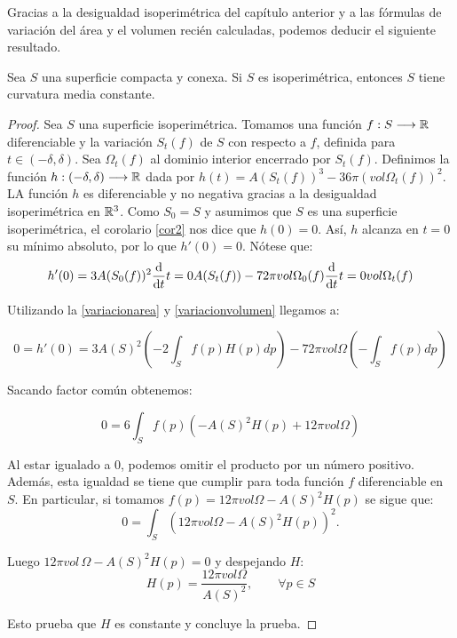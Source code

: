 Gracias a la desigualdad isoperimétrica del capítulo anterior y a las fórmulas de variación del área y el volumen recién calculadas, podemos deducir el siguiente resultado.

\begin{theorem}\label{meancurvaturecte}
Sea $S$ una superficie compacta y conexa. Si $S$ es isoperimétrica, entonces $S$ tiene curvatura media constante.
\end{theorem}
\begin{proof}
Sea $S$ una superficie isoperimétrica. Tomamos una función $f: S \longrightarrow \mathbb{R}$ diferenciable y la variación $S_t(f)$ de $S$ con respecto a $f$, definida para $t \in (-\delta, \delta)$. Sea $\Omega_t(f)$ al dominio interior encerrado por $S_t(f)$. Definimos la función $h: (-\delta, \delta) \longrightarrow \mathbb{R}$ dada por $h(t) = A(S_t(f))^3 - 36\pi(vol \Omega_t(f))^2$. LA función $h$ es diferenciable y no negativa gracias a la desigualdad isoperimétrica en $\mathbb{R}^3$. Como $S_0=S$ y asumimos que $S$ es una superficie isoperimétrica, el corolario \autoref{cor2} nos dice que $h(0)=0$. Así, $h$ alcanza en $t=0$ su mínimo absoluto, por lo que $h'(0)=0$. Nótese que:
%
\begin{equation*}
    h'(0) = 3A(S_0(f))^2 \diff{}{t}{t=0} A(S_t(f)) - 72\pi vol \Omega_0(f) \diff{}{t}{t=0} vol \Omega_t(f)
\end{equation*}

Utilizando la \autoref{variacionarea} y \autoref{variacionvolumen} llegamos a:

\begin{equation*}
    0 = h'(0) = 3A(S)^2 \left( -2 \int_S f(p)H(p)dp \right) - 72\pi vol \Omega \left( - \int_S f(p) dp \right)
\end{equation*}

Sacando factor común obtenemos:

\begin{equation*}
    0 = 6 \int_S f(p)(-A(S)^2H(p) + 12 \pi vol \Omega)
\end{equation*}

Al estar igualado a $0$, podemos omitir el producto por un número positivo. Además, esta igualdad se tiene que cumplir para toda función $f$ diferenciable en $S$. En particular, si tomamos $f(p) = 12 \pi vol \Omega - A(S)^2H(p)$ se sigue que:
%
\begin{equation*}
    0 = \int_S \left( 12 \pi vol \Omega - A(S)^2H(p) \right)^2.
\end{equation*}

Luego $12 \pi vol \, \Omega - A(S)^2H(p) = 0$ y despejando $H$:
%
\begin{equation*}
    H(p) = \frac{12 \pi vol \Omega}{A(S)^2}, \qquad \forall p \in S
\end{equation*}

Esto prueba que $H$ es constante y concluye la prueba.
\end{proof}

